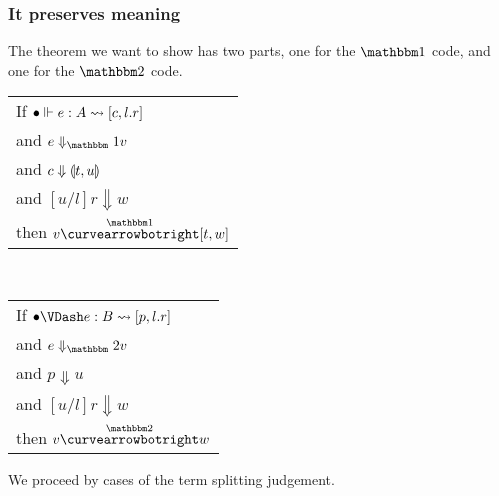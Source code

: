 \documentclass{article}
\begin{document}
\subsubsection{It preserves meaning}

The theorem we want to show has two parts, one for the $\bbone$ code, and one for the $\bbtwo$ code.  
\begin{center}
\begin{tabular}{l}
If $\splitone [\emptyC]{e}{A}{c,l.r}$ \\
and $\reduceone{e}{v}$ \\
and $c \Downarrow \valprod{t}{u}$ \\
and $[u/l]r \Downarrow w$ \\
then $v \vsplito [t,w]$
\end{tabular}
~~~
\begin{tabular}{l}
If $\splittwo[\emptyC]{e}{B}{p,l.r}$ \\
and $\reducetwo{e}{v}$ \\
and $p \Downarrow u$ \\
and $[u/l]r \Downarrow w$ \\
then $v \vsplits w$
\end{tabular}
\end{center}

We proceed by cases of the term splitting judgement.
\end{document}
